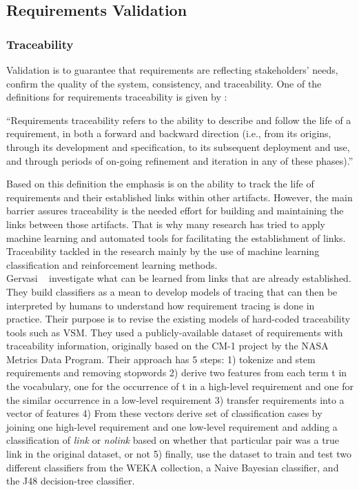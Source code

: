\subsection{Requirements Validation}

\subsubsection{Traceability}

Validation is to guarantee that requirements are reflecting stakeholders' needs,
confirm the quality of the system, consistency, and traceability.
 One of the definitions for requirements traceability is given by
 \cite{Gotel:1994}:
\begin{displayquote} 
“Requirements traceability refers to the ability to describe and follow the life
of a requirement, in both a forward and backward direction (i.e., from its
origins, through its development and specification, to its subsequent deployment
and use, and through periods of on-going refinement and iteration in any of
these phases).”
\end{displayquote}
Based on this definition the emphasis is on the ability to track the life of
requirements and their established links within other artifacts. However, the
main barrier assures traceability is the needed effort for building and
maintaining the links between those artifacts. That is why many research has
tried to apply machine learning and automated tools for facilitating the
establishment of links\cite{Gervasi:2011}.
Traceability tackled in the research mainly by the use of machine learning
classification and reinforcement learning methods.\\

Gervasi \etal~\cite{Gervasi:2011} investigate what can be learned from links that are already established. They build classifiers as a mean to develop models of tracing that can then be interpreted by humans to understand how requirement tracing is done in practice. Their purpose is to revise the existing models of hard-coded traceability tools such as VSM. They used a publicly-available dataset of requirements with traceability information, originally based on the CM-1 project by the NASA Metrics Data Program. Their approach has 5 steps: 1) tokenize and stem requirements and removing stopwords 2) derive two features from each term t in the vocabulary, one for the occurrence of t in a high-level requirement and one for the similar occurrence in a low-level requirement 3) transfer requirements into a vector of features 4) From these vectors derive set of classification cases by joining one high-level requirement and one low-level requirement and adding a classification of \textit{link} or \textit{nolink} based on whether that particular pair was a true link in the original dataset, or not 5) finally, use the dataset to train and test two different classifiers from the WEKA collection, a Naive Bayesian classifier, and the J48 decision-tree classifier.\newline

